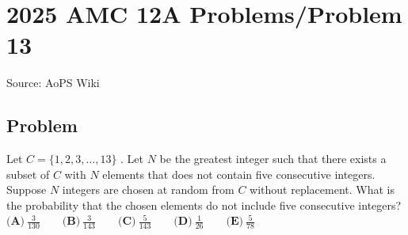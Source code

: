 \documentclass[12pt]{article}
\begin{document}
\section*{{2025 AMC 12A Problems/Problem 13}}
Source: AoPS Wiki

\subsection*{Problem}
Let $C = \{1, 2, 3, \dots, 13\}$ . Let $N$ be the greatest integer such that there exists a subset of $C$ with $N$ elements that does not contain five consecutive integers. Suppose $N$ integers are chosen at random from $C$ without replacement. What is the probability that the chosen elements do not include five consecutive integers? $\textbf{(A)}~\frac{3}{130} \qquad \textbf{(B)}~\frac{3}{143} \qquad \textbf{(C)}~\frac{5}{143} \qquad \textbf{(D)}~\frac{1}{26} \qquad \textbf{(E)}~\frac{5}{78}$
\end{document}
